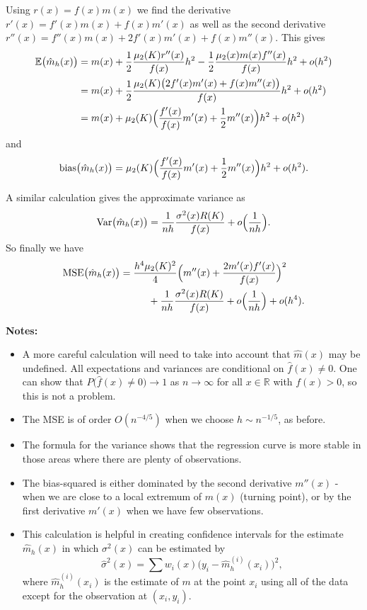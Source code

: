 \documentclass[
  a4paper,
]{article}
\providecommand{\tightlist}{%
  \setlength{\itemsep}{0pt}\setlength{\parskip}{0pt}}
\theoremstyle{definition}
\theoremstyle{definition}
\theoremstyle{definition}
\theoremstyle{definition}
\theoremstyle{remark}
\begin{document}
Using \(r(x) = f(x) m(x)\) we find the derivative
\(r'(x) = f'(x) m(x) + f(x) m'(x)\)
as well as the second derivative
\(r''(x) = f''(x) m(x) + 2 f'(x) m'(x) + f(x) m''(x)\).
This gives
\begin{align*}
  \mathbb{E}\bigl( \hat m_h(x) \bigr)
  &= m(x)
    + \frac12 \frac{\mu_2(K) r''(x)}{f(x)} h^2
    - \frac12 \frac{\mu_2(x) m(x) f''(x)}{f(x)} h^2
    + o(h^2) \\
  &= m(x)
    + \frac12 \frac{\mu_2(K) \bigl(2 f'(x) m'(x) + f(x) m''(x)\bigr)}{f(x)} h^2
    + o(h^2) \\
  &= m(x)
    + \mu_2(K) \Bigl( \frac{f'(x)}{f(x)} m'(x) + \frac12 m''(x) \Bigr) h^2
    + o(h^2)
\end{align*}
and
\begin{equation*}
  \mathop{\mathrm{bias}}\bigl( \hat m_h(x) \bigr)
  = \mu_2(K) \Bigl( \frac{f'(x)}{f(x)} m'(x) + \frac12 m''(x) \Bigr) h^2
    + o(h^2).
\end{equation*}

A similar calculation gives the approximate variance as
\begin{equation*}
  \mathop{\mathrm{Var}}\bigl( \hat m_h(x) \bigr)
  = \frac{1}{nh} \frac{\sigma^2(x) R(K)}{f(x)} + o\Bigl( \frac{1}{nh} \Bigr).
\end{equation*}
So finally we have
\begin{align*}
  \mathop{\mathrm{MSE}}\nolimits\bigl( \hat m_h(x) \bigr)
  &= \frac{h^4 \mu_2(K)^2}{4} \Bigl(m''(x) +\frac{2m'(x) f'(x)}{f(x)} \Bigr)^2 \\
  &\hskip1cm + \frac{1}{nh} \frac{\sigma^2(x) R(K)}{f(x)} + o\Bigl( \frac{1}{nh} \Bigr) + o(h^4).
\end{align*}

\textbf{Notes:}

\begin{itemize}
\tightlist
\item
  A more careful calculation will need to take into account that \(\hat m(x)\)
  may be undefined. All expectations and variances are conditional on
  \(\hat f(x) \neq 0\). One can show that \(P\bigl( \hat f(x) \neq 0 \bigr) \to 1\)
  as \(n\to\infty\) for all \(x\in\mathbb{R}\) with \(f(x) > 0\), so this is not a problem.
\item
  The MSE is of order \(O(n^{-4/5})\) when we choose \(h \sim n^{-1/5}\), as before.
\item
  The formula for the variance shows that the regression curve is more stable
  in those areas where there are plenty of observations.
\item
  The bias-squared is either dominated by the second derivative
  \(m''(x)\) - when we are close to a local extremum of \(m(x)\) (turning point),
  or by the first derivative \(m'(x)\) when we have few observations.
\item
  This calculation is helpful in creating confidence intervals for the estimate
  \(\hat m_h(x)\) in which \(\sigma^2(x)\) can be estimated by
  \[\hat \sigma^2(x) = \sum w_i(x) \bigl( y_i-\hat m_h^{(i)}(x_i) \bigr)^2,\]
  where \(\hat m_h^{(i)}(x_i)\) is the estimate of \(m\) at the point \(x_i\) using
  all of the data except for the observation at \((x_i, y_i)\).
\end{itemize}
\end{document}
